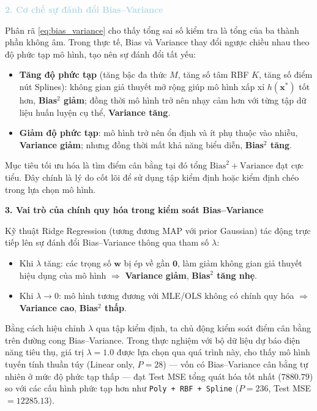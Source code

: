\vspace{0.5em}
\textcolor{lightblue}{\textbf{2. Cơ chế sự đánh đổi Bias--Variance}}
\vspace{0.5em}

Phân rã \eqref{eq:bias_variance} cho thấy tổng sai số kiểm tra là tổng của ba 
thành phần không âm. Trong thực tế, Bias và Variance thay đổi ngược chiều nhau 
theo độ phức tạp mô hình, tạo nên sự đánh đổi tất yếu:

\begin{itemize} [labelsep=10pt, leftmargin=2cm]
    \item \textbf{Tăng độ phức tạp} (tăng bậc đa thức $M$, tăng số tâm RBF $K$, 
    tăng số điểm nút Splines): không gian giả thuyết mở rộng giúp mô hình xấp xỉ 
    $h(\boldsymbol{x}^*)$ tốt hơn, \textbf{Bias$^2$ giảm}; đồng thời 
    mô hình trở nên nhạy cảm hơn với từng tập dữ liệu huấn luyện cụ thể, \textbf{Variance tăng}.

    \item \textbf{Giảm độ phức tạp}: mô hình trở nên ổn định và ít phụ thuộc vào 
    nhiễu, \textbf{Variance giảm}; nhưng đồng thời mất khả năng biểu 
    diễn, \textbf{Bias$^2$ tăng}.
\end{itemize}

Mục tiêu tối ưu hóa là tìm điểm cân bằng tại đó tổng 
$\mathrm{Bias}^2 + \mathrm{Variance}$ đạt cực tiểu. Đây chính là lý do cốt lõi 
để sử dụng tập kiểm định hoặc kiểm định chéo 
trong lựa chọn mô hình.

\textbf{3. Vai trò của chính quy hóa trong kiểm soát Bias--Variance}

Kỹ thuật Ridge Regression (tương đương MAP với prior Gaussian) tác động trực tiếp 
lên sự đánh đổi Bias--Variance thông qua tham số $\lambda$:

\begin{itemize} [labelsep=10pt, leftmargin=2cm]
    \item Khi $\lambda$ tăng: các trọng số $\boldsymbol{w}$ bị ép về gần $\boldsymbol{0}$, 
    làm giảm không gian giả thuyết hiệu dụng của mô hình 
    $\Rightarrow$ \textbf{Variance giảm}, \textbf{Bias$^2$ tăng nhẹ}.
    \item Khi $\lambda \to 0$: mô hình tương đương với MLE/OLS không có chính quy hóa 
    $\Rightarrow$ \textbf{Variance cao}, \textbf{Bias$^2$ thấp}.
\end{itemize}

Bằng cách hiệu chỉnh $\lambda$ qua tập kiểm định, ta chủ động kiểm soát điểm 
cân bằng trên đường cong Bias--Variance. Trong thực nghiệm với bộ dữ liệu dự báo 
điện năng tiêu thụ, giá trị $\lambda = 1.0$ được lựa chọn qua quá trình này, cho 
thấy mô hình tuyến tính thuần túy (Linear only, $P=28$) --- vốn có Bias--Variance 
cân bằng tự nhiên ở mức độ phức tạp thấp --- đạt Test MSE tổng quát hóa tốt nhất 
($7880.79$) so với các cấu hình phức tạp hơn như \texttt{Poly + RBF + Spline} 
($P=236$, Test MSE $= 12285.13$).

